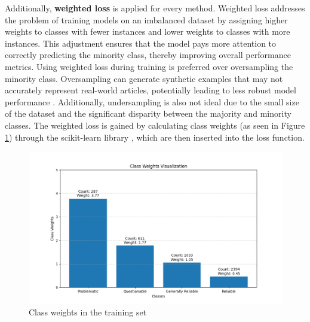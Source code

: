 Additionally, \textbf{weighted loss} is applied for every method. Weighted loss addresses the problem of training models on an imbalanced dataset by assigning higher weights to classes with fewer instances and lower weights to classes with more instances. This adjustment ensures that the model pays more attention to correctly predicting the minority class, thereby improving overall performance metrics. Using weighted loss during training is preferred over oversampling the minority class. Oversampling can generate synthetic examples that may not accurately represent real-world articles, potentially leading to less robust model performance \cite{alkhawaldeh-2023-challenges}. Additionally, undersampling is also not ideal due to the small size of the dataset and the significant disparity between the majority and minority classes. The weighted loss is gained by calculating class weights (as seen in Figure \ref{fig:class_weights}) through the scikit-learn library \cite{pedregosa-2011-scikit-learn}, which are then inserted into the loss function.

\begin{figure}[htbp]
    \centering
    \includegraphics[width=0.8\linewidth]{figures/class_weights.png}
    \caption{Class weights in the training set}
    \label{fig:class_weights}
\end{figure}




